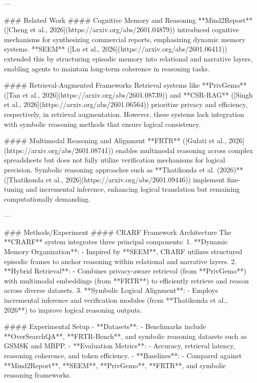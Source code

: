 ---

### Related Work
#### Cognitive Memory and Reasoning
**Mind2Report** ([Cheng et al., 2026](https://arxiv.org/abs/2601.04879)) introduced cognitive mechanisms for synthesizing commercial reports, emphasizing dynamic memory systems. **SEEM** ([Lu et al., 2026](https://arxiv.org/abs/2601.06411)) extended this by structuring episodic memory into relational and narrative layers, enabling agents to maintain long-term coherence in reasoning tasks.

#### Retrieval-Augmented Frameworks
Retrieval systems like **PrivGemo** ([Tan et al., 2026](https://arxiv.org/abs/2601.08739)) and **CSR-RAG** ([Singh et al., 2026](https://arxiv.org/abs/2601.06564)) prioritize privacy and efficiency, respectively, in retrieval augmentation. However, these systems lack integration with symbolic reasoning methods that ensure logical consistency.

#### Multimodal Reasoning and Alignment
**FRTR** ([Gulati et al., 2026](https://arxiv.org/abs/2601.08741)) enables multimodal reasoning across complex spreadsheets but does not fully utilize verification mechanisms for logical precision. Symbolic reasoning approaches such as **Thatikonda et al. (2026)** ([Thatikonda et al., 2026](https://arxiv.org/abs/2601.09446)) implement fine-tuning and incremental inference, enhancing logical translation but remaining computationally demanding.

---

### Methods/Experiment
#### CRARF Framework Architecture
The **CRARF** system integrates three principal components:
1. **Dynamic Memory Organization**:
   - Inspired by **SEEM**, CRARF utilizes structured episodic frames to anchor reasoning within relational and narrative layers.
2. **Hybrid Retrieval**:
   - Combines privacy-aware retrieval (from **PrivGemo**) with multimodal embeddings (from **FRTR**) to efficiently retrieve and reason across diverse datasets.
3. **Symbolic Logical Alignment**:
   - Employs incremental inference and verification modules (from **Thatikonda et al., 2026**) to improve logical reasoning outputs.

#### Experimental Setup
- **Datasets**:
  - Benchmarks include **OverSearchQA**, **FRTR-Bench**, and symbolic reasoning datasets such as GSM8K and MBPP.
- **Evaluation Metrics**:
  - Accuracy, retrieval latency, reasoning coherence, and token efficiency.
- **Baselines**:
  - Compared against **Mind2Report**, **SEEM**, **PrivGemo**, **FRTR**, and symbolic reasoning frameworks.

